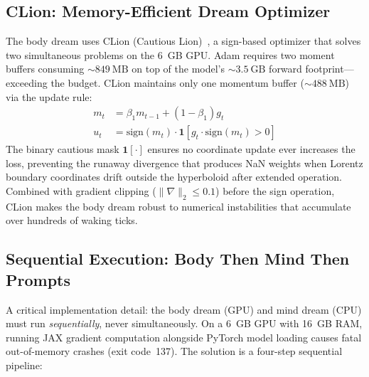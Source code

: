 \documentclass[11pt,a4paper,twocolumn]{article}
\begin{document}
\subsection{CLion: Memory-Efficient Dream Optimizer}

The body dream uses CLion (Cautious Lion)~\cite{clion2025}, a sign-based optimizer that solves two simultaneous problems on the 6~GB GPU.
Adam requires two moment buffers consuming ${\sim}849~\mathrm{MB}$ on top of the model's ${\sim}3.5~\mathrm{GB}$ forward footprint---exceeding the budget.
CLion maintains only one momentum buffer (${\sim}488~\mathrm{MB}$) via the update rule:
\begin{align}
m_t &= \beta_1 m_{t-1} + (1-\beta_1)g_t \label{eq:clion_m} \\
u_t &= \mathrm{sign}(m_t)\cdot\mathbf{1}[g_t \cdot \mathrm{sign}(m_t)>0] \label{eq:clion_u}
\end{align}
The binary cautious mask $\mathbf{1}[\cdot]$ ensures no coordinate update ever increases the loss, preventing the runaway divergence that produces NaN weights when Lorentz boundary coordinates drift outside the hyperboloid after extended operation.
Combined with gradient clipping ($\|\nabla\|_2 \leq 0.1$) before the sign operation, CLion makes the body dream robust to numerical instabilities that accumulate over hundreds of waking ticks.

\subsection{Sequential Execution: Body Then Mind Then Prompts}

A critical implementation detail: the body dream (GPU) and mind dream (CPU) must run \emph{sequentially}, never simultaneously. On a 6~GB GPU with 16~GB RAM, running JAX gradient computation alongside PyTorch model loading causes fatal out-of-memory crashes (exit code~137). The solution is a four-step sequential pipeline:
\end{document}
